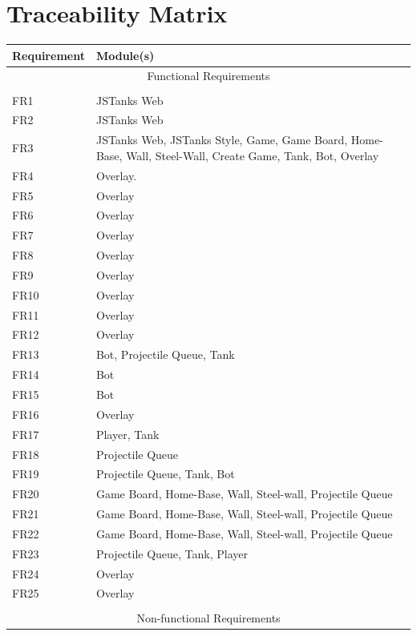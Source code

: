 \documentclass{article}
\begin{document}
\section{Traceability Matrix}
\begin{tabularx}{\textwidth}{l X}
        \toprule
        Requirement & Module(s) \\
        \midrule
        \multicolumn{2}{c}{Functional Requirements} \\
        \midrule \\
        FR1 & JSTanks Web \\
        FR2 & JSTanks Web\\
        FR3 & JSTanks Web, JSTanks Style, Game, Game Board, Home-Base, Wall, Steel-Wall, Create Game, Tank, Bot, Overlay \\
        FR4 & Overlay.\\
        FR5 & Overlay\\
        FR6 & Overlay \\
        FR7 & Overlay\\
        FR8 & Overlay\\
        FR9 & Overlay \\
        FR10 & Overlay \\
        FR11 & Overlay \\
        FR12 & Overlay\\
        FR13 & Bot, Projectile Queue, Tank \\
        FR14 & Bot\\
        FR15 & Bot\\
        FR16 & Overlay\\
        FR17 & Player, Tank\\
        FR18 & Projectile Queue\\
        FR19 & Projectile Queue, Tank, Bot\\
        FR20 & Game Board, Home-Base, Wall, Steel-wall, Projectile Queue\\
        FR21 & Game Board, Home-Base, Wall, Steel-wall, Projectile Queue\\
        FR22 & Game Board, Home-Base, Wall, Steel-wall, Projectile Queue\\
        FR23 & Projectile Queue, Tank, Player \\
        FR24 & Overlay \\
        FR25 & Overlay \\ \\
        \midrule
        \multicolumn{2}{c}{Non-functional Requirements} \\ 

\end{tabularx}
\end{document}
